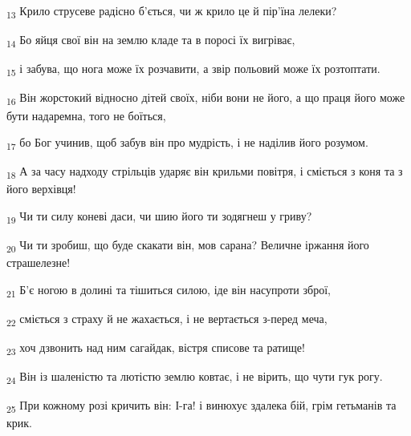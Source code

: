 \begin{tcolorbox}
\textsubscript{13} Крило струсеве радісно б'ється, чи ж крило це й пір'їна лелеки?
\end{tcolorbox}
\begin{tcolorbox}
\textsubscript{14} Бо яйця свої він на землю кладе та в поросі їх вигріває,
\end{tcolorbox}
\begin{tcolorbox}
\textsubscript{15} і забува, що нога може їх розчавити, а звір польовий може їх розтоптати.
\end{tcolorbox}
\begin{tcolorbox}
\textsubscript{16} Він жорстокий відносно дітей своїх, ніби вони не його, а що праця його може бути надаремна, того не боїться,
\end{tcolorbox}
\begin{tcolorbox}
\textsubscript{17} бо Бог учинив, щоб забув він про мудрість, і не наділив його розумом.
\end{tcolorbox}
\begin{tcolorbox}
\textsubscript{18} А за часу надходу стрільців ударяє він крильми повітря, і сміється з коня та з його верхівця!
\end{tcolorbox}
\begin{tcolorbox}
\textsubscript{19} Чи ти силу коневі даси, чи шию його ти зодягнеш у гриву?
\end{tcolorbox}
\begin{tcolorbox}
\textsubscript{20} Чи ти зробиш, що буде скакати він, мов сарана? Величне іржання його страшелезне!
\end{tcolorbox}
\begin{tcolorbox}
\textsubscript{21} Б'є ногою в долині та тішиться силою, іде він насупроти зброї,
\end{tcolorbox}
\begin{tcolorbox}
\textsubscript{22} сміється з страху й не жахається, і не вертається з-перед меча,
\end{tcolorbox}
\begin{tcolorbox}
\textsubscript{23} хоч дзвонить над ним сагайдак, вістря списове та ратище!
\end{tcolorbox}
\begin{tcolorbox}
\textsubscript{24} Він із шаленістю та лютістю землю ковтає, і не вірить, що чути гук рогу.
\end{tcolorbox}
\begin{tcolorbox}
\textsubscript{25} При кожному розі кричить він: І-га! і винюхує здалека бій, грім гетьманів та крик.
\end{tcolorbox}
